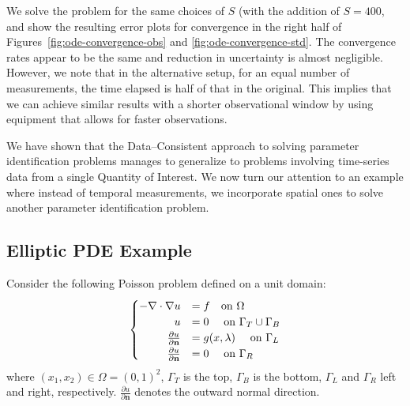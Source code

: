 We solve the problem for the same choices of $S$ (with the addition of $S=400$, and show the resulting error plots for convergence in the right half of Figures~\ref{fig:ode-convergence-obs} and \ref{fig:ode-convergence-std}.
The convergence rates appear to be the same and reduction in uncertainty is almost negligible.
However, we note that in the alternative setup, for an equal number of measurements, the time elapsed is half of that in the original.
This implies that we can achieve similar results with a shorter observational window by using equipment that allows for faster observations.

We have shown that the Data--Consistent approach to solving parameter identification problems manages to generalize to problems involving time-series data from a single Quantity of Interest.
We now turn our attention to an example where instead of temporal measurements, we incorporate spatial ones to solve another parameter identification problem.



\FloatBarrier
\subsection{Elliptic PDE Example}\label{subsec:pde-example}

Consider the following Poisson problem defined on a unit domain:
\begin{equation}\label{eq:pde-equation}
\begin{cases}
\hfill -\nabla \cdot \nabla u &= f \quad\text{on } \Omega \\
\hfill u &= 0 \quad\text{ on } \Gamma_T \cup \Gamma_B \\
\hfill \frac{\partial u}{\partial \mathbf{n}} &= g(x,\param) \quad\text{ on } \Gamma_L \\
\hfill \frac{\partial u}{\partial \mathbf{n}} &= 0 \quad\text{ on } \Gamma_R
\end{cases}
\end{equation}
where $(x_1, x_2) \in \Omega = (0,1)^2$, $\Gamma_T$ is the top, $\Gamma_B$ is the bottom, $\Gamma_L$ and $\Gamma_R$ left and right, respectively.
$\frac{\partial u}{\partial \mathbf{n}}$ denotes the outward normal direction.

